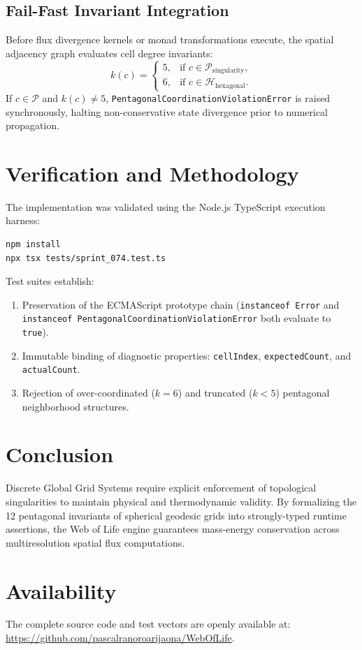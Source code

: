 \documentclass[11pt,a4paper]{article}
\begin{document}
\subsection{Fail-Fast Invariant Integration}
Before flux divergence kernels or monad transformations execute, the spatial adjacency graph evaluates cell degree invariants:
\begin{equation}
k(c) = \begin{cases}
5, & \text{if } c \in \mathcal{P}_{\text{singularity}}, \\
6, & \text{if } c \in \mathcal{H}_{\text{hexagonal}}.
\end{cases}
\end{equation}
If $c \in \mathcal{P}$ and $k(c) \neq 5$, \texttt{PentagonalCoordinationViolationError} is raised synchronously, halting non-conservative state divergence prior to numerical propagation.

\section{Verification and Methodology}

The implementation was validated using the Node.js TypeScript execution harness:
\begin{lstlisting}
npm install
npx tsx tests/sprint_074.test.ts
\end{lstlisting}

Test suites establish:
\begin{enumerate}
    \item Preservation of the ECMAScript prototype chain (\texttt{instanceof Error} and \texttt{instanceof PentagonalCoordinationViolationError} both evaluate to \texttt{true}).
    \item Immutable binding of diagnostic properties: \texttt{cellIndex}, \texttt{expectedCount}, and \texttt{actualCount}.
    \item Rejection of over-coordinated ($k=6$) and truncated ($k<5$) pentagonal neighborhood structures.
\end{enumerate}

\section{Conclusion}

Discrete Global Grid Systems require explicit enforcement of topological singularities to maintain physical and thermodynamic validity. By formalizing the 12 pentagonal invariants of spherical geodesic grids into strongly-typed runtime assertions, the Web of Life engine guarantees mass-energy conservation across multiresolution spatial flux computations.

\section*{Availability}
The complete source code and test vectors are openly available at:\\
\url{https://github.com/pascalranoroarijaona/WebOfLife}.
\end{document}
